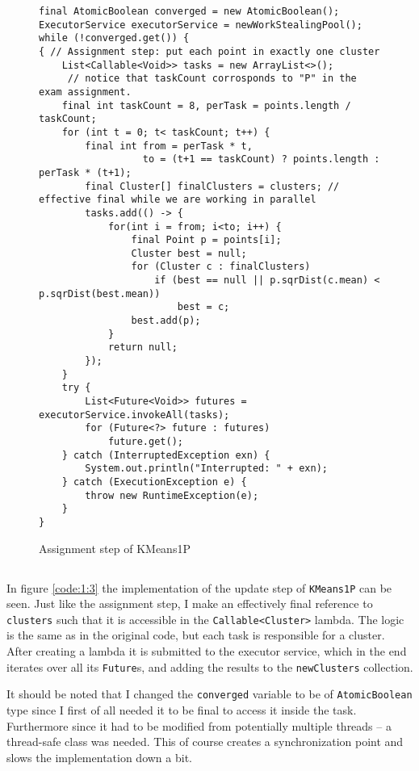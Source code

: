 \begin{figure}
\begin{lstlisting}
final AtomicBoolean converged = new AtomicBoolean();
ExecutorService executorService = newWorkStealingPool();
while (!converged.get()) {
{ // Assignment step: put each point in exactly one cluster
    List<Callable<Void>> tasks = new ArrayList<>();
     // notice that taskCount corrosponds to "P" in the exam assignment.
    final int taskCount = 8, perTask = points.length / taskCount;
    for (int t = 0; t< taskCount; t++) {
        final int from = perTask * t,
                  to = (t+1 == taskCount) ? points.length : perTask * (t+1);
        final Cluster[] finalClusters = clusters; // effective final while we are working in parallel
        tasks.add(() -> {
            for(int i = from; i<to; i++) {
                final Point p = points[i];
                Cluster best = null;
                for (Cluster c : finalClusters)
                    if (best == null || p.sqrDist(c.mean) < p.sqrDist(best.mean))
                        best = c;
                best.add(p);
            }
            return null;
        });
    }
    try {
        List<Future<Void>> futures = executorService.invokeAll(tasks);
        for (Future<?> future : futures)
            future.get();
    } catch (InterruptedException exn) {
        System.out.println("Interrupted: " + exn);
    } catch (ExecutionException e) {
        throw new RuntimeException(e);
    }
}
\end{lstlisting}
\caption{Assignment step of KMeans1P}
\label{code:1:2}
\end{figure}

\subsection{}
In figure \ref{code:1:3} the implementation of the update step of \texttt{KMeans1P} can be seen. Just like the assignment step, I make an effectively final reference to \texttt{clusters} such that it is accessible in the \texttt{Callable<Cluster>} lambda. The logic is the same as in the original code, but each task is responsible for a cluster. After creating a lambda it is submitted to the executor service, which in the end iterates over all its \texttt{Future}s, and adding the results to the \texttt{newClusters} collection. 

It should be noted that I changed the \texttt{converged} variable to be of \texttt{AtomicBoolean} type since I first of all needed it to be final to access it inside the task. Furthermore since it had to be modified from potentially multiple threads -- a thread-safe class was needed. This of course creates a synchronization point and slows the implementation down a bit.

